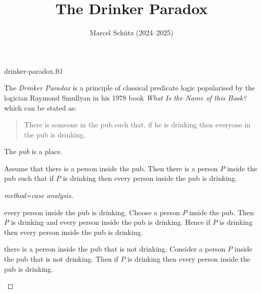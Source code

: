 \documentclass{article}
\title{The Drinker Paradox}
\author{Marcel Schütz (2024--2025)}
\date{}
\begin{document}
\begin{smodule}{drinker-paradox.ftl}
\maketitle


\noindent The \emph{Drinker Paradox} is a principle of classical predicate 
logic popularised by the logician Raymond Smullyan in his 1978 book
\textit{What Is the Name of this Book?} \cite{Smullyan1978} which can be 
stated as:

\begin{quotation}
  \ifstexhtml\else\noindent\fi
  There is someone in the pub such that, if he is drinking then  everyone in the
  pub is drinking.
\end{quotation}

\begin{forthel}

  \begin{signature*}
    The \emph{pub} is a place.
  \end{signature*}
  
  \begin{theorem*}[title=Drinker Paradox,id=drinker_paradox]
    Assume that there is a person inside the pub.
    Then there is a person $P$ inside the pub such that if $P$ is drinking then every person inside the pub is drinking.
  \end{theorem*}
  \begin{proof}[method=case analysis]
    \begin{case}{every person inside the pub is drinking.}
      Choose a person $P$ inside the pub.
      Then $P$ is drinking and every person inside the pub is drinking.
      Hence if $P$ is drinking then every person inside the pub is drinking.
    \end{case}
  
    \begin{case}{there is a person inside the pub that is not drinking.}
      Consider a person $P$ inside the pub that is not drinking.
      Then if $P$ is drinking then every person inside the pub is drinking.
    \end{case}
  \end{proof}
\end{forthel}

\printbibliography
{}
\end{smodule}
\end{document}
